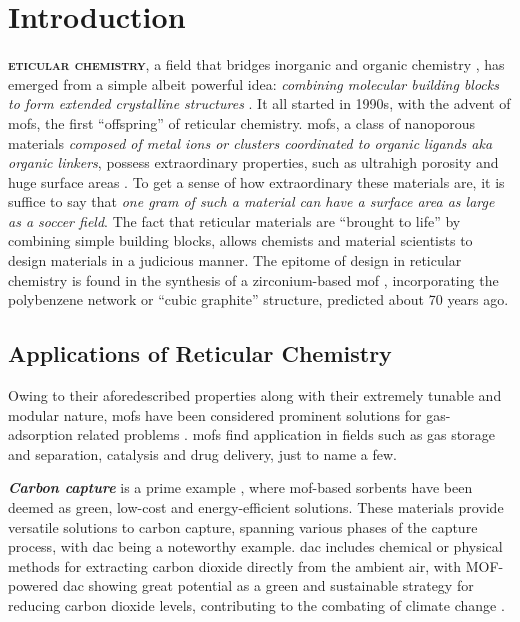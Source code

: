 \chapter{Introduction}

\lettrine[
	nindent=0em, findent=0.5em, loversize=-0.12, lines=5
]{}{\bfseries\color{Blue}eticular chemistry}, a field that bridges inorganic and
organic chemistry \parencite{Yaghi2020}, has emerged from a simple albeit
powerful idea: \emph{combining molecular building blocks to form extended
crystalline structures} \parencite{yaghi}. It all started in 1990s, with the
advent of \glspl{mof}, the first ``offspring''
of reticular chemistry. \glspl{mof}, a class of nanoporous materials
\emph{composed of metal ions or clusters
coordinated to organic ligands aka organic
linkers}, possess extraordinary properties, such as
ultrahigh porosity and huge surface areas \parencite{Farha_2012}. To get a sense
of how extraordinary these materials are, it is suffice to say that \emph{one
gram of such a material can have a surface area as large as a soccer field}.
The fact that reticular materials are ``brought to
life'' by combining simple building blocks, allows chemists and material
scientists to design materials in a judicious manner. The epitome of design in
reticular chemistry is found in the synthesis of a zirconium-based \gls{mof}
\parencite{Alezi2016}, incorporating the polybenzene network or ``cubic
graphite'' structure, predicted about 70 years ago.

\section{Applications of Reticular Chemistry}

Owing to their aforedescribed properties along with their extremely tunable and
modular nature, \glspl{mof} have been considered prominent solutions for
gas-adsorption related problems \parencite{Li2007, Jiang2022}.  \glspl{mof} find
application in fields such as gas storage and
separation, catalysis and drug
delivery, just to name a few.

\emph{\bfseries Carbon capture} is a prime example
\parencite{An_2009, Sumida2011, Qazvini2021}, where \gls{mof}-based sorbents
have been deemed as green, low-cost and energy-efficient solutions. These
materials provide versatile solutions to carbon capture, spanning various phases
of the capture process, with \gls{dac} being a
noteworthy example.  \gls{dac} includes chemical or physical methods for
extracting carbon dioxide directly from the ambient air, with MOF-powered
\gls{dac} showing great potential as a green and sustainable strategy for
reducing carbon dioxide levels, contributing to the combating of climate change
\parencite{Bose2023}.

